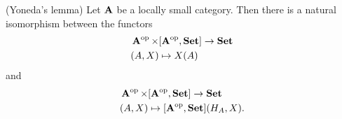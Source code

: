 \begin{theorem}(Yoneda's lemma)\label{def:yoneda_lemma}\cite[theorem 4.2.1]{Leinster2014}
  Let $\Bold A$ be a locally small category. Then there is a natural isomorphism between the functors
  \begin{align*}
    &\Bold{A}^{\Op} \times [\Bold{A}^{\Op}, \Bold{Set}] \to \Bold{Set} \\
    &(A, X) \mapsto X(A)
  \end{align*}
  and
  \begin{align*}
    &\Bold{A}^{\Op} \times [\Bold{A}^{\Op}, \Bold{Set}] \to \Bold{Set} \\
    &(A, X) \mapsto [\Bold{A}^{\Op}, \Bold{Set}](H_A, X).
  \end{align*}
\end{theorem}
